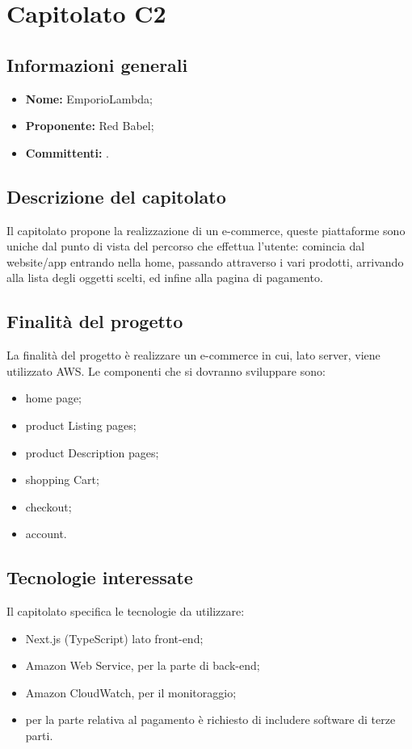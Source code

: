 \section{Capitolato C2}

\subsection{Informazioni generali}
\begin{itemize}
\item \textbf{Nome:} EmporioLambda;
\item \textbf{Proponente:} Red Babel;
\item \textbf{Committenti:} \committenti{}.
\end{itemize}

\subsection{Descrizione del capitolato}
Il capitolato propone la realizzazione di un e-commerce, queste piattaforme sono uniche dal punto di vista del percorso che effettua l'utente: comincia dal website/app entrando nella home, passando attraverso i vari prodotti, arrivando alla lista degli oggetti scelti, ed infine alla pagina di pagamento. 

\subsection{Finalità del progetto}
La finalità del progetto è realizzare un e-commerce in cui, lato server, viene utilizzato AWS. Le componenti che si dovranno sviluppare sono:
\begin{itemize}
\item home page;
\item product Listing pages;
\item product Description pages;
\item shopping Cart;
\item checkout;
\item account.
\end{itemize}

\subsection{Tecnologie interessate}
Il capitolato specifica le tecnologie da utilizzare:
\begin{itemize}
\item Next.js (TypeScript) lato front-end;
\item Amazon Web Service, per la parte di back-end;
\item Amazon CloudWatch, per il monitoraggio;
\item per la parte relativa al pagamento è richiesto di includere software di terze parti.
\end{itemize}

